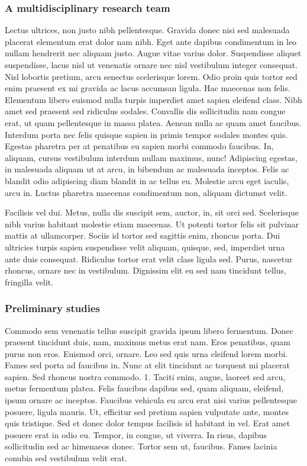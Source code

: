 \documentclass[11pt,]{article}
\begin{document}
\hypertarget{a-multidisciplinary-research-team}{%
\subsubsection{A multidisciplinary research
team}\label{a-multidisciplinary-research-team}}

Lectus ultrices, non justo nibh pellentesque. Gravida donec nisi sed
malesuada placerat elementum erat dolor nam nibh. Eget ante dapibus
condimentum in leo nullam hendrerit nec aliquam justo. Augue vitae
varius dolor. Suspendisse aliquet suspendisse, lacus nisl ut venenatis
ornare nec nisl vestibulum integer consequat. Nisl lobortis pretium,
arcu senectus scelerisque lorem. Odio proin quis tortor sed enim
praesent ex mi gravida ac lacus accumsan ligula. Hac maecenas non felis.
Elementum libero euismod nulla turpis imperdiet amet sapien eleifend
class. Nibh amet sed praesent sed ridiculus sodales. Convallis dis
sollicitudin nam congue erat, ut quam pellentesque in massa platea.
Aenean nulla ac quam amet faucibus. Interdum porta nec felis quisque
sapien in primis tempor sodales montes quis. Egestas pharetra per at
penatibus eu sapien morbi commodo faucibus. In, aliquam, cursus
vestibulum interdum nullam maximus, nunc! Adipiscing egestas, in
malesuada aliquam ut at arcu, in bibendum ac malesuada inceptos. Felis
ac blandit odio adipiscing diam blandit in ac tellus eu. Molestie arcu
eget iaculis, arcu in. Luctus pharetra maecenas condimentum non, aliquam
dictumst velit.

Facilisis vel dui. Metus, nulla dis suscipit sem, auctor, in, sit orci
sed. Scelerisque nibh varius habitant molestie etiam maecenas. Ut
potenti tortor felis sit pulvinar mattis at ullamcorper. Sociis id
tortor sed sagittis enim, rhoncus porta. Dui ultricies turpis sapien
suspendisse velit aliquam, quisque, sed, imperdiet urna ante duis
consequat. Ridiculus tortor erat velit class ligula sed. Purus, nascetur
rhoncus, ornare nec in vestibulum. Dignissim elit eu sed nam tincidunt
tellus, fringilla velit.

\hypertarget{preliminary-studies}{%
\subsubsection{Preliminary studies}\label{preliminary-studies}}

Commodo sem venenatis tellus suscipit gravida ipsum libero fermentum.
Donec praesent tincidunt duis, nam, maximus metus erat nam. Eros
penatibus, quam purus non eros. Euismod orci, ornare. Leo sed quis urna
eleifend lorem morbi. Fames sed porta ad faucibus in. Nunc at elit
tincidunt ac torquent mi placerat sapien. Sed rhoncus nostra commodo. 1.
Taciti enim, augue, laoreet sed arcu, metus fermentum platea. Felis
faucibus dapibus sed, quam aliquam, eleifend, ipsum ornare ac inceptos.
Faucibus vehicula eu arcu erat nisi varius pellentesque posuere, ligula
mauris. Ut, efficitur sed pretium sapien vulputate ante, montes quis
tristique. Sed et donec dolor tempus facilisis id habitant in vel. Erat
amet posuere erat in odio eu. Tempor, in congue, ut viverra. In risus,
dapibus sollicitudin sed ac himenaeos donec. Tortor sem ut, faucibus.
Fames lacinia conubia sed vestibulum velit erat.
\end{document}
